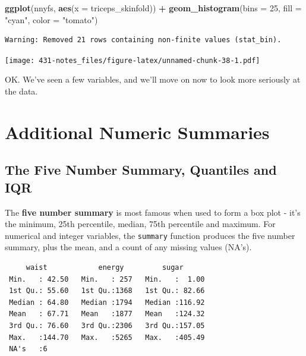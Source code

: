 \documentclass[
]{book}
\newenvironment{Shaded}{\begin{snugshade}}{\end{snugshade}}
\newcommand{\DataTypeTok}[1]{\textcolor[rgb]{0.13,0.29,0.53}{#1}}
\newcommand{\DecValTok}[1]{\textcolor[rgb]{0.00,0.00,0.81}{#1}}
\newcommand{\KeywordTok}[1]{\textcolor[rgb]{0.13,0.29,0.53}{\textbf{#1}}}
\newcommand{\NormalTok}[1]{#1}
\newcommand{\OperatorTok}[1]{\textcolor[rgb]{0.81,0.36,0.00}{\textbf{#1}}}
\newcommand{\StringTok}[1]{\textcolor[rgb]{0.31,0.60,0.02}{#1}}
\begin{document}
\begin{Shaded}
\begin{Highlighting}[]
\KeywordTok{ggplot}\NormalTok{(nnyfs, }\KeywordTok{aes}\NormalTok{(}\DataTypeTok{x =}\NormalTok{ triceps_skinfold)) }\OperatorTok{+}
\StringTok{  }\KeywordTok{geom_histogram}\NormalTok{(}\DataTypeTok{bins =} \DecValTok{25}\NormalTok{, }\DataTypeTok{fill =} \StringTok{"cyan"}\NormalTok{, }\DataTypeTok{color =} \StringTok{"tomato"}\NormalTok{)}
\end{Highlighting}
\end{Shaded}

\begin{verbatim}
Warning: Removed 21 rows containing non-finite values (stat_bin).
\end{verbatim}

\texttt{[image: 431-notes\_files/figure-latex/unnamed-chunk-38-1.pdf]}

OK. We've seen a few variables, and we'll move on now to look more seriously at the data.

\hypertarget{additional-numeric-summaries}{%
\section{Additional Numeric Summaries}\label{additional-numeric-summaries}}

\hypertarget{the-five-number-summary-quantiles-and-iqr}{%
\subsection{The Five Number Summary, Quantiles and IQR}\label{the-five-number-summary-quantiles-and-iqr}}

The \textbf{five number summary} is most famous when used to form a box plot - it's the minimum, 25th percentile, median, 75th percentile and maximum. For numerical and integer variables, the \texttt{summary} function produces the five number summary, plus the mean, and a count of any missing values (NA's).

\begin{Shaded}
\end{Shaded}

\begin{verbatim}
     waist            energy         sugar       
 Min.   : 42.50   Min.   : 257   Min.   :  1.00  
 1st Qu.: 55.60   1st Qu.:1368   1st Qu.: 82.66  
 Median : 64.80   Median :1794   Median :116.92  
 Mean   : 67.71   Mean   :1877   Mean   :124.32  
 3rd Qu.: 76.60   3rd Qu.:2306   3rd Qu.:157.05  
 Max.   :144.70   Max.   :5265   Max.   :405.49  
 NA's   :6                                       
\end{verbatim}
\end{document}
